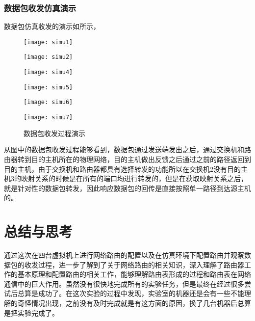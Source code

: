 \documentclass[lang=cn,11pt]{elegantpaper}
\begin{document}
\subsubsection{数据包收发仿真演示}
数据包仿真收发的演示如所示，
\begin{figure}[htbp]
	\begin{minipage}[t]{0.48\textwidth}
		\centering
		\texttt{[image: simu1]}
	\end{minipage}
	\begin{minipage}[t]{0.48\textwidth}
		\centering
		\texttt{[image: simu2]}
	\end{minipage}
	\begin{minipage}[t]{0.48\textwidth}
		\centering
		\texttt{[image: simu4]}
	\end{minipage}
	\begin{minipage}[t]{0.48\textwidth}
		\centering
		\texttt{[image: simu5]}
	\end{minipage}
	\begin{minipage}[t]{0.48\textwidth}
	\centering
	\texttt{[image: simu6]}
	\end{minipage}
	\begin{minipage}[t]{0.48\textwidth}
	\centering
	\texttt{[image: simu7]}
	\end{minipage}
	\caption{数据包收发过程演示 \label{fig:rip}}
\end{figure}
从图中的数据包收发过程能够看到，数据包通过发送端发出之后，通过交换机和路由器转到目的主机所在的物理网络，目的主机做出反馈之后通过之前的路径返回到目的主机，由于交换机和路由器都具有选择转发的功能所以在交换机2没有目的主机3的映射关系的时候是在所有的端口均进行转发的，但是在获取映射关系之后，就是针对性的数据包转发，因此响应数据包的回传是直接按照单一路径到达源主机的。

\section{总结与思考}
通过这次在四台虚拟机上进行网络路由的配置以及在仿真环境下配置路由并观察数据包的收发过程，进一步了解到了关于网络路由的相关知识，深入理解了路由器工作的基本原理和配置路由的相关工作，能够理解路由表形成的过程和路由表在网络通信中的巨大作用。虽然没有很快地完成所有的实验任务，但是最终在经过很多尝试后总算是成功了。在这次实验的过程中发现，实验室的机器还是会有一些不能理解的奇怪情况出现，之前没有及时完成就是有这方面的原因，换了几台机器后总算是把实验完成了。


%
%
\end{document}
